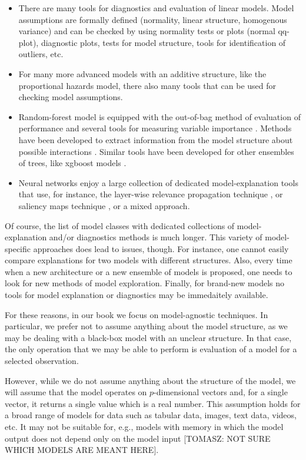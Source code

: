 \documentclass[]{krantz}
\providecommand{\tightlist}{%
  \setlength{\itemsep}{0pt}\setlength{\parskip}{0pt}}
\theoremstyle{definition}
\theoremstyle{definition}
\theoremstyle{definition}
\theoremstyle{remark}
\begin{document}
\begin{itemize}
\tightlist
\item
  There are many tools for diagnostics and evaluation of linear models.
  Model assumptions are formally defined (normality, linear structure,
  homogenous variance) and can be checked by using normality tests or
  plots (normal qq-plot), diagnostic plots, tests for model structure,
  tools for identification of outliers, etc.
\item
  For many more advanced models with an additive structure, like the
  proportional hazards model, there also many tools that can be used for
  checking model assumptions.
\item
  Random-forest model is equipped with the out-of-bag method of
  evaluation of performance and several tools for measuring variable
  importance \citep{R-randomForest}. Methods have been developed to
  extract information from the model structure about possible
  interactions \citep{R-randomForestExplainer}. Similar tools have been
  developed for other ensembles of trees, like xgboost models
  \citep{R-xgboostExplainer}.
\item
  Neural networks enjoy a large collection of dedicated
  model-explanation tools that use, for instance, the layer-wise
  relevance propagation technique \citep{BachLWRP}, or saliency maps
  technique \citep{SaliencyMaps}, or a mixed approach.
\end{itemize}

Of course, the list of model classes with dedicated collections of
model-explanation and/or diagnostics methods is much longer. This
variety of model-specific approaches does lead to issues, though. For
instance, one cannot easily compare explanations for two models with
different structures. Also, every time when a new architecture or a new
ensemble of models is proposed, one needs to look for new methods of
model exploration. Finally, for brand-new models no tools for model
explanation or diagnostics may be immedaitely available.

For these reasons, in our book we focus on model-agnostic techniques. In
particular, we prefer not to assume anything about the model structure,
as we may be dealing with a black-box model with an unclear structure.
In that case, the only operation that we may be able to perform is
evaluation of a model for a selected observation.

However, while we do not assume anything about the structure of the
model, we will assume that the model operates on \(p\)-dimensional
vectors and, for a single vector, it returns a single value which is a
real number. This assumption holds for a broad range of models for data
such as tabular data, images, text data, videos, etc. It may not be
suitable for, e.g., models with memory in which the model output does
not depend only on the model input {[}TOMASZ: NOT SURE WHICH MODELS ARE
MEANT HERE{]}.
\end{document}
